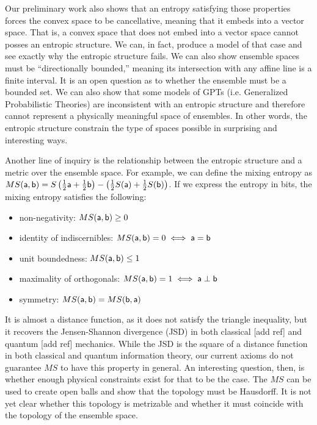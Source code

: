 Our preliminary work also shows that an entropy satisfying those properties forces the convex space to be cancellative, meaning that it embeds into a vector space. That is, a convex space that does not embed into a vector space cannot posses an entropic structure. We can, in fact, produce a model of that case and see exactly why the entropic structure fails. We can also show ensemble spaces must be ``directionally bounded,'' meaning its intersection with any affine line is a finite interval. It is an open question as to whether the ensemble must be a bounded set. We can also show that some models of GPTs (i.e. Generalized Probabilistic Theories) are inconsistent with an entropic structure and therefore cannot represent a physically meaningful space of ensembles. In other words, the entropic structure constrain the type of spaces possible in surprising and interesting ways.

Another line of inquiry is the relationship between the entropic structure and a metric over the ensemble space. For example, we can define the mixing entropy as $MS(\ens[a], \ens[b]) = S\left(\frac{1}{2}\ens[a] + \frac{1}{2} \ens[b]\right) - \left(\frac{1}{2} S(\ens[a]) + \frac{1}{2} S(\ens[b])\right)$. If we express the entropy in bits, the mixing entropy satisfies the following:
\begin{itemize}
	\item non-negativity: $MS(\ens[a], \ens[b]) \geq 0$
	\item identity of indiscernibles: $MS(\ens[a], \ens[b]) = 0 \iff \ens[a]=\ens[b]$
	\item unit boundedness: $MS(\ens[a], \ens[b]) \leq 1$
	\item maximality of orthogonals: $MS(\ens[a], \ens[b]) = 1 \iff \ens[a] \ortho \ens[b]$
	\item symmetry: $MS(\ens[a], \ens[b]) = MS(\ens[b], \ens[a])$
\end{itemize}
It is almost a distance function, as it does not satisfy the triangle inequality, but it recovers the Jensen-Shannon divergence (JSD) in both classical [add ref] and quantum [add ref] mechanics. While the JSD is the square of a distance function in both classical and quantum information theory, our current axioms do not guarantee $MS$ to have this property in general. An interesting question, then, is whether enough physical constraints exist for that to be the case. The $MS$ can be used to create open balls and show that the topology must be Hausdorff. It is not yet clear whether this topology is metrizable and whether it must coincide with the topology of the ensemble space.

